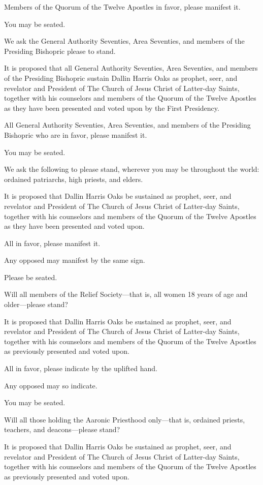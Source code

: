 \documentclass[letterpaper, 11pt]{report}
\begin{document}
Members of the Quorum of the Twelve Apostles in favor, please manifest it.

You may be seated.

We ask the General Authority Seventies, Area Seventies, and members of the Presiding Bishopric please to stand.

It is proposed that all General Authority Seventies, Area Seventies, and members of the Presiding Bishopric sustain Dallin Harris Oaks as prophet, seer, and revelator and President of The Church of Jesus Christ of Latter-day Saints, together with his counselors and members of the Quorum of the Twelve Apostles as they have been presented and voted upon by the First Presidency.

All General Authority Seventies, Area Seventies, and members of the Presiding Bishopric who are in favor, please manifest it.

You may be seated.

We ask the following to please stand, wherever you may be throughout the world: ordained patriarchs, high priests, and elders.

It is proposed that Dallin Harris Oaks be sustained as prophet, seer, and revelator and President of The Church of Jesus Christ of Latter-day Saints, together with his counselors and members of the Quorum of the Twelve Apostles as they have been presented and voted upon.

All in favor, please manifest it.

Any opposed may manifest by the same sign.

Please be seated.

Will all members of the Relief Society—that is, all women 18 years of age and older—please stand?

It is proposed that Dallin Harris Oaks be sustained as prophet, seer, and revelator and President of The Church of Jesus Christ of Latter-day Saints, together with his counselors and members of the Quorum of the Twelve Apostles as previously presented and voted upon.

All in favor, please indicate by the uplifted hand.

Any opposed may so indicate.

You may be seated.

Will all those holding the Aaronic Priesthood only—that is, ordained priests, teachers, and deacons—please stand?

It is proposed that Dallin Harris Oaks be sustained as prophet, seer, and revelator and President of The Church of Jesus Christ of Latter-day Saints, together with his counselors and members of the Quorum of the Twelve Apostles as previously presented and voted upon.
\end{document}
